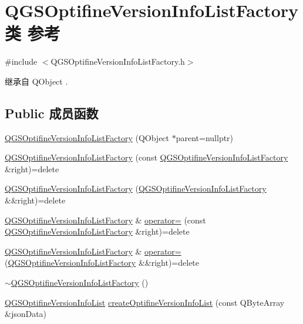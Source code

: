 \hypertarget{class_q_g_s_optifine_version_info_list_factory}{}\section{Q\+G\+S\+Optifine\+Version\+Info\+List\+Factory类 参考}
\label{class_q_g_s_optifine_version_info_list_factory}


{\ttfamily \#include $<$Q\+G\+S\+Optifine\+Version\+Info\+List\+Factory.\+h$>$}



继承自 Q\+Object .

\subsection*{Public 成员函数}
\begin{DoxyCompactItemize}
\item 
\mbox{\hyperlink{class_q_g_s_optifine_version_info_list_factory_a671b354610df98049760d80bff5e3e21}{Q\+G\+S\+Optifine\+Version\+Info\+List\+Factory}} (Q\+Object $\ast$parent=nullptr)
\item 
\mbox{\hyperlink{class_q_g_s_optifine_version_info_list_factory_a8f8956f7e14507e29a859c2e488619ed}{Q\+G\+S\+Optifine\+Version\+Info\+List\+Factory}} (const \mbox{\hyperlink{class_q_g_s_optifine_version_info_list_factory}{Q\+G\+S\+Optifine\+Version\+Info\+List\+Factory}} \&right)=delete
\item 
\mbox{\hyperlink{class_q_g_s_optifine_version_info_list_factory_a652bf525d51ea3aea572524a9c8e2da1}{Q\+G\+S\+Optifine\+Version\+Info\+List\+Factory}} (\mbox{\hyperlink{class_q_g_s_optifine_version_info_list_factory}{Q\+G\+S\+Optifine\+Version\+Info\+List\+Factory}} \&\&right)=delete
\item 
\mbox{\hyperlink{class_q_g_s_optifine_version_info_list_factory}{Q\+G\+S\+Optifine\+Version\+Info\+List\+Factory}} \& \mbox{\hyperlink{class_q_g_s_optifine_version_info_list_factory_aa9057ad4ed2a95a54a96b398787d2d4f}{operator=}} (const \mbox{\hyperlink{class_q_g_s_optifine_version_info_list_factory}{Q\+G\+S\+Optifine\+Version\+Info\+List\+Factory}} \&right)=delete
\item 
\mbox{\hyperlink{class_q_g_s_optifine_version_info_list_factory}{Q\+G\+S\+Optifine\+Version\+Info\+List\+Factory}} \& \mbox{\hyperlink{class_q_g_s_optifine_version_info_list_factory_a4b256b135405ee0f68dfa62492e38022}{operator=}} (\mbox{\hyperlink{class_q_g_s_optifine_version_info_list_factory}{Q\+G\+S\+Optifine\+Version\+Info\+List\+Factory}} \&\&right)=delete
\item 
\mbox{\hyperlink{class_q_g_s_optifine_version_info_list_factory_a3c8fc3b1a832e5edd385dc90b39ba72f}{$\sim$\+Q\+G\+S\+Optifine\+Version\+Info\+List\+Factory}} ()
\item 
\mbox{\hyperlink{class_q_g_s_optifine_version_info_list}{Q\+G\+S\+Optifine\+Version\+Info\+List}} \mbox{\hyperlink{class_q_g_s_optifine_version_info_list_factory_a494665bc0f53d69a9cf5a311efebc173}{create\+Optifine\+Version\+Info\+List}} (const Q\+Byte\+Array \&json\+Data)
\end{DoxyCompactItemize}


